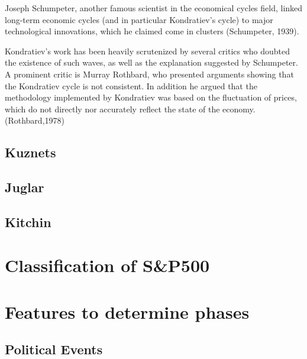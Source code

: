 \documentclass[]{book}
\begin{document}
Joseph Schumpeter, another famous scientist in the economical cycles field, linked long-term economic cycles (and in particular Kondratiev's cycle) to major technological innovations, which he claimed come in clusters (Schumpeter, 1939).

Kondratiev's work has been heavily scrutenized by several critics who doubted the existence of such waves, as well as the explanation suggested by Schumpeter. A prominent critic is Murray Rothbard, who presented arguments showing that the Kondratiev cycle is not consistent. In addition he argued that the methodology implemented by Kondratiev was based on the fluctuation of prices, which do not directly nor accurately reflect the state of the economy. (Rothbard,1978)

\hypertarget{kuznets}{%
\subsection{Kuznets}\label{kuznets}}

\hypertarget{juglar}{%
\subsection{Juglar}\label{juglar}}

\hypertarget{kitchin}{%
\subsection{Kitchin}\label{kitchin}}

\citep{kitchin1923cycles}
\citep{crum1923cycles}
\citep{crum1925progressive}

\hypertarget{classification-of-sp500}{%
\section{Classification of S\&P500}\label{classification-of-sp500}}

\hypertarget{features-to-determine-phases}{%
\section{Features to determine phases}\label{features-to-determine-phases}}

\hypertarget{political-events}{%
\subsection{Political Events}\label{political-events}}
\end{document}
